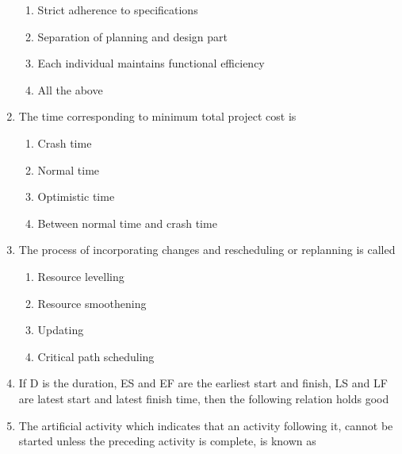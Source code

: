 \documentclass[11pt,a4paper]{article}
\begin{document}
\begin{enumerate}
\begin{enumerate}[label=\Alph*.]
\item{Strict adherence to specifications}
\item{Separation of planning and design part}
\item{Each individual maintains functional efficiency}
\item{All the above}
\end{enumerate}
\item{The time corresponding to minimum total project cost is}
\begin{enumerate}[label=\Alph*.]
\item{Crash time}
\item{Normal time}
\item{Optimistic time}
\item{Between normal time and crash time}
\end{enumerate}
\item{The process of incorporating changes and rescheduling or replanning is called}
\begin{enumerate}[label=\Alph*.]
\item{Resource levelling}
\item{Resource smoothening}
\item{Updating}
\item{Critical path scheduling}
\end{enumerate}
\item{If D is the duration, ES and EF are the earliest start and finish, LS and LF are latest start and latest finish time, then the following relation holds good}
\\
\item{The artificial activity which indicates that an activity following it, cannot be started unless the preceding activity is complete, is known as}
\\
\end{enumerate}
\end{document}
